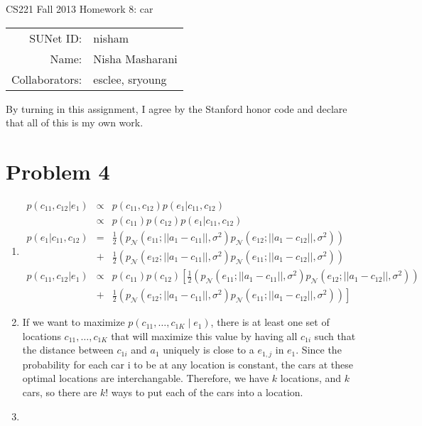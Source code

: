 \documentclass[12pt]{article}
\begin{document}
\begin{center}
{\Large CS221 Fall 2013 Homework 8: car}

\begin{tabular}{rl}
SUNet ID: & nisham \\
Name: & Nisha Masharani \\
Collaborators: & esclee, sryoung
\end{tabular}
\end{center}

By turning in this assignment, I agree by the Stanford honor code and declare
that all of this is my own work.

\section*{Problem 4}

\begin{enumerate}[label=(\alph*)]
  \item 
  \begin{eqnarray*}
  p(c_{11}, c_{12} | e_1) &\propto& p(c_{11}, c_{12})p(e_1|c_{11}, c_{12})\\
  &\propto& p(c_{11})p(c_{12})p(e_1|c_{11}, c_{12})\\
  p(e_1|c_{11}, c_{12}) &=& \frac{1}{2}\left(p_{\mathcal N}(e_{11}; ||a_1 - c_{11}||, \sigma^2)p_{\mathcal N}(e_{12}; ||a_1 - c_{12}||, \sigma^2)\right) \\
  &+& \frac{1}{2}\left(p_{\mathcal N}(e_{12}; ||a_1 - c_{11}||, \sigma^2)p_{\mathcal N}(e_{11}; ||a_1 - c_{12}||, \sigma^2)\right)\\
  p(c_{11}, c_{12} | e_1) &\propto& p(c_{11})p(c_{12})\left[\frac{1}{2}\left(p_{\mathcal N}(e_{11}; ||a_1 - c_{11}||, \sigma^2)p_{\mathcal N}(e_{12}; ||a_1 - c_{12}||, \sigma^2)\right)\right. \\
  &+& \left.\frac{1}{2}\left(p_{\mathcal N}(e_{12}; ||a_1 - c_{11}||, \sigma^2)p_{\mathcal N}(e_{11}; ||a_1 - c_{12}||, \sigma^2)\right)\right]
  \end{eqnarray*}
  \item If we want to maximize $p(c_{11}, \dots, c_{1K} \mid e_1)$, there is at least one set of locations $c_{11}, \dots, c_{1K}$ that will maximize this value by having all $c_{1i}$ such that the distance between $c_{1i}$ and $a_1$ uniquely is close to a $e_{1,j}$ in $e_1$. Since the probability for each car i to be at any location is constant, the cars at these optimal locations are interchangable. Therefore, we have $k$ locations, and $k$ cars, so there are $k!$ ways to put each of the cars into a location.
  \item
\end{enumerate}
\end{document}
